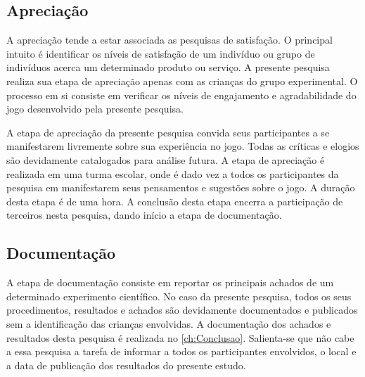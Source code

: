 \subsection{Apreciação}\label{subsec:grupo}

A apreciação tende a estar associada as pesquisas de satisfação. O principal intuito é identificar os níveis de satisfação de um indivíduo ou grupo de indivíduos acerca um determinado produto ou serviço. A presente pesquisa realiza sua etapa de apreciação apenas com as crianças do grupo experimental. O processo em si consiste em verificar os níveis de engajamento e agradabilidade do jogo desenvolvido pela presente pesquisa.

A etapa de apreciação da presente pesquisa convida seus participantes a se manifestarem livremente sobre sua experiência no jogo. Todas as críticas e elogios são devidamente catalogados para análise futura. A etapa de apreciação é realizada em uma turma escolar, onde é dado vez a todos os participantes da pesquisa em manifestarem seus pensamentos e sugestões sobre o jogo. A duração desta etapa é de uma hora. A conclusão desta etapa encerra a participação de terceiros nesta pesquisa, dando início a etapa de documentação. 


\subsection{Documentação}\label{subsec:documentacao}

A etapa de documentação consiste em reportar os principais achados de um determinado experimento científico. No caso da presente pesquisa, todos os seus procedimentos, resultados e achados são devidamente documentados e publicados sem a identificação das crianças envolvidas. A documentação dos achados e resultados desta pesquisa é realizada no \autoref{ch:Conclusao}. Salienta-se que não cabe a essa pesquisa a tarefa de informar a todos os participantes envolvidos, o local e a data de publicação dos resultados do presente estudo. 

